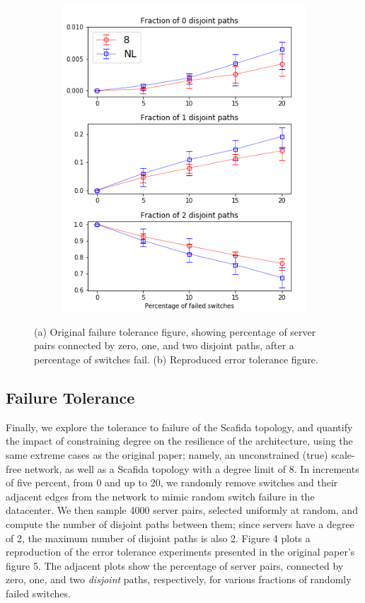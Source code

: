 \begin{figure}[t]

\begin{subfigure}[b]{0.5\textwidth}
\centering
   \includegraphics[width=0.95\linewidth]{figures/error}
   \caption{}
\end{subfigure}
\caption{(a) Original failure tolerance figure, showing percentage of server pairs connected by zero, one, and two disjoint paths, after a percentage of switches fail. (b) Reproduced error tolerance figure. }
\end{figure}

\subsection{Failure Tolerance}

Finally, we explore the tolerance to failure of the Scafida topology, and quantify the impact of constraining degree on the resilience of the architecture, using the same extreme cases as the original paper; namely, an unconstrained (true) scale-free network, as well as a Scafida topology with a degree limit of 8. In increments of five percent, from 0 and up to 20, we randomly remove switches and their adjacent edges from the network to mimic random switch failure in the datacenter. We then sample 4000 server pairs, selected uniformly at random, and compute the number of disjoint paths between them; since servers have a degree of 2, the maximum number of disjoint paths is also 2. Figure 4 plots a reproduction of the error tolerance experiments presented in the original paper's figure 5. The adjacent plots show the percentage of server pairs, connected by zero, one, and two \textit{disjoint} paths, respectively, for various fractions of randomly failed switches.

